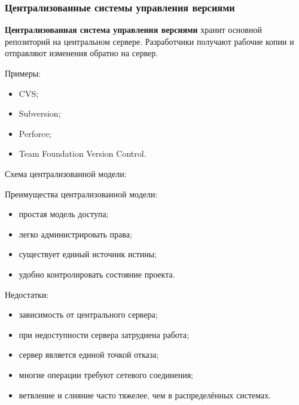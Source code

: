 \documentclass[12pt,a4paper]{article}
\begin{document}
\subsubsection{Централизованные системы управления версиями}

\textbf{Централизованная система управления версиями} хранит основной репозиторий на центральном сервере. Разработчики получают рабочие копии и отправляют изменения обратно на сервер.

Примеры:

\begin{itemize}
    \item CVS;
    \item Subversion;
    \item Perforce;
    \item Team Foundation Version Control.
\end{itemize}

Схема централизованной модели:

\begin{center}
\end{center}

Преимущества централизованной модели:

\begin{itemize}
    \item простая модель доступа;
    \item легко администрировать права;
    \item существует единый источник истины;
    \item удобно контролировать состояние проекта.
\end{itemize}

Недостатки:

\begin{itemize}
    \item зависимость от центрального сервера;
    \item при недоступности сервера затруднена работа;
    \item сервер является единой точкой отказа;
    \item многие операции требуют сетевого соединения;
    \item ветвление и слияние часто тяжелее, чем в распределённых системах.
\end{itemize}
\end{document}
